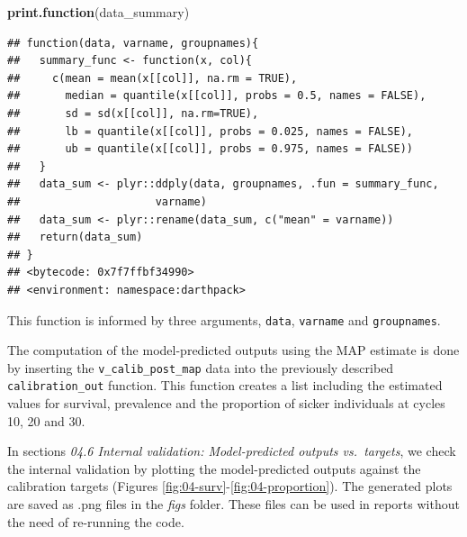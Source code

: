 \documentclass[]{book}
\newenvironment{Shaded}{\begin{snugshade}}{\end{snugshade}}
\newcommand{\KeywordTok}[1]{\textcolor[rgb]{0.13,0.29,0.53}{\textbf{#1}}}
\newcommand{\NormalTok}[1]{#1}
\begin{document}
\begin{Shaded}
\begin{Highlighting}[]
\KeywordTok{print.function}\NormalTok{(data_summary)}
\end{Highlighting}
\end{Shaded}

\begin{verbatim}
## function(data, varname, groupnames){
##   summary_func <- function(x, col){
##     c(mean = mean(x[[col]], na.rm = TRUE),
##       median = quantile(x[[col]], probs = 0.5, names = FALSE),
##       sd = sd(x[[col]], na.rm=TRUE),
##       lb = quantile(x[[col]], probs = 0.025, names = FALSE),
##       ub = quantile(x[[col]], probs = 0.975, names = FALSE))
##   }
##   data_sum <- plyr::ddply(data, groupnames, .fun = summary_func, 
##                     varname)
##   data_sum <- plyr::rename(data_sum, c("mean" = varname))
##   return(data_sum)
## }
## <bytecode: 0x7f7ffbf34990>
## <environment: namespace:darthpack>
\end{verbatim}

This function is informed by three arguments, \texttt{data},
\texttt{varname} and \texttt{groupnames}.

The computation of the model-predicted outputs using the MAP estimate is
done by inserting the \texttt{v\_calib\_post\_map} data into the
previously described \texttt{calibration\_out} function. This function
creates a list including the estimated values for survival, prevalence
and the proportion of sicker individuals at cycles 10, 20 and 30.

In sections \emph{04.6 Internal validation: Model-predicted outputs
vs.~targets}, we check the internal validation by plotting the
model-predicted outputs against the calibration targets (Figures
\ref{fig:04-surv}-\ref{fig:04-proportion}). The generated plots are
saved as .png files in the \emph{figs} folder. These files can be used
in reports without the need of re-running the code.
\end{document}
